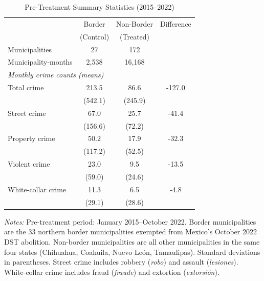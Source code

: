 \begin{table}[htbp]
\centering
\caption{Pre-Treatment Summary Statistics (2015--2022)}
\label{tab:summary}
\begin{threeparttable}
\begin{tabular}{lccc}
\toprule
 & Border & Non-Border & Difference \\
 & (Control) & (Treated) & \\
\midrule
Municipalities & 27 & 172 & \\
Municipality-months & 2,538 & 16,168 & \\
\midrule
\multicolumn{4}{l}{\textit{Monthly crime counts (means)}} \\[3pt]
Total crime & 213.5 & 86.6 & -127.0 \\
 & (542.1) & (245.9) & \\
Street crime & 67.0 & 25.7 & -41.4 \\
 & (156.6) & (72.2) & \\
Property crime & 50.2 & 17.9 & -32.3 \\
 & (117.2) & (52.5) & \\
Violent crime & 23.0 & 9.5 & -13.5 \\
 & (59.0) & (24.6) & \\
White-collar crime & 11.3 & 6.5 & -4.8 \\
 & (29.1) & (28.6) & \\
\bottomrule
\end{tabular}
\begin{tablenotes}[flushleft]\small
\item \textit{Notes:} Pre-treatment period: January 2015--October 2022. Border municipalities are the 33 northern border municipalities exempted from Mexico's October 2022 DST abolition. Non-border municipalities are all other municipalities in the same four states (Chihuahua, Coahuila, Nuevo Le\'on, Tamaulipas). Standard deviations in parentheses. Street crime includes robbery (\textit{robo}) and assault (\textit{lesiones}). White-collar crime includes fraud (\textit{fraude}) and extortion (\textit{extorsi\'on}).
\end{tablenotes}
\end{threeparttable}
\end{table}
